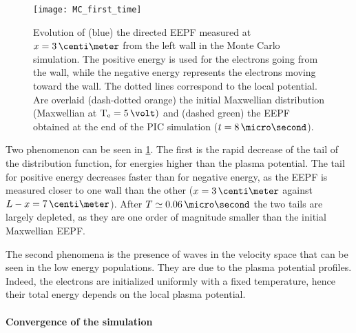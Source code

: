     \begin{figure}[!hbt]
      \centering
      \texttt{[image: MC\_first\_time]}
      \caption{Evolution of (blue) the directed EEPF measured at $x=3\,\centi\meter$ from the left wall in the Monte Carlo simulation. The positive energy is used for the electrons going from the wall, while the negative energy represents the electrons moving toward the wall. The dotted lines correspond to the local potential. Are overlaid (dash-dotted orange) the initial Maxwellian distribution (Maxwellian at $\Te=5\,\volt)$ and (dashed green) the EEPF obtained at the end of the \acs{PIC} simulation ($t=8\,\micro\second$). }
      \label{fig-zoom_init_Mc}
    \end{figure}
    

    Two phenomenon can be seen in  \cref{fig-zoom_init_Mc}.
    The first is the rapid decrease of the tail of the distribution function, for energies higher than the plasma potential.
    The tail for positive energy decreases faster than for negative energy, as the EEPF is measured closer to one wall than the other ($x=3\,\centi\meter$ against $L-x=7\,\centi\meter$).
    After $ T \simeq 0.06\,\micro\second$ the two tails are largely depleted, as they are one order of magnitude smaller than the initial Maxwellian EEPF.

    The second phenomena is the presence of waves in the velocity space that can be seen in the low energy populations.
    They are due to the plasma potential profiles.
    Indeed, the electrons are initialized uniformly  with a fixed temperature, hence their total energy depends on the local plasma potential. 

    \paragraph{Convergence of the simulation\\ }

